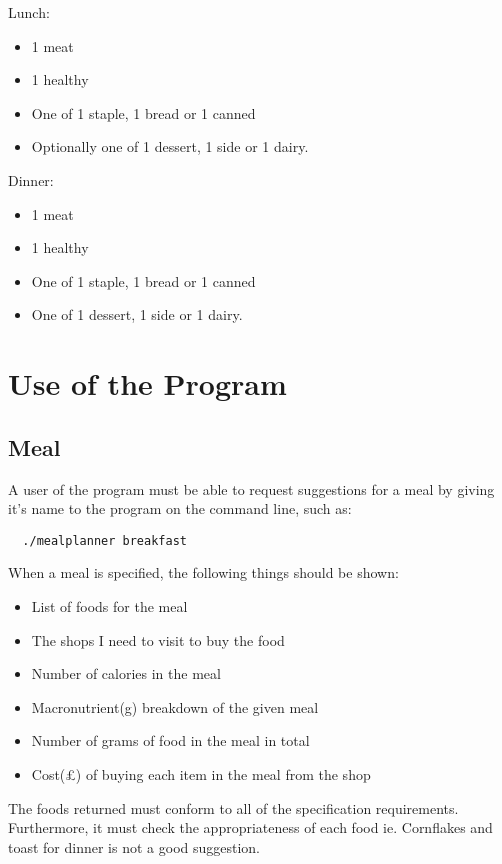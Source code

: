 \documentclass[a4paper]{article}
\begin{document}
Lunch:
\begin{itemize}
  \item 1 meat
  \item 1 healthy
  \item One of 1 staple, 1 bread or 1 canned 
  \item Optionally one of 1 dessert, 1 side or 1 dairy.
\end{itemize}

Dinner:
\begin{itemize}
  \item 1 meat
  \item 1 healthy
  \item One of 1 staple, 1 bread or 1 canned 
  \item One of 1 dessert, 1 side or 1 dairy.
\end{itemize}

\section{Use of the Program}

\subsection{Meal}

A user of the program must be able to request suggestions for a meal by giving it's name 
to the program on the command line, such as:

\begin{verbatim}
  ./mealplanner breakfast
\end{verbatim}

When a meal is specified, the following things should be shown:

\begin{itemize}
  \item List of foods for the meal
  \item The shops I need to visit to buy the food
  \item Number of calories in the meal
  \item Macronutrient(g) breakdown of the given meal
  \item Number of grams of food in the meal in total
  \item Cost(£) of buying each item in the meal from the shop
\end{itemize}

The foods returned must conform to all of the specification 
requirements. Furthermore, it must check the appropriateness of each 
food ie. Cornflakes and toast for dinner is not a good suggestion.
\end{document}
